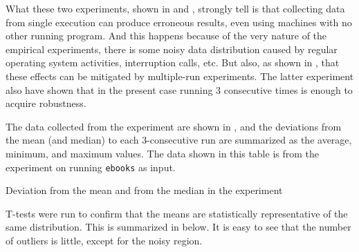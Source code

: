 What these two experiments, shown in  and , strongly tell is that collecting data from single execution can produce erroneous results, even using machines with no other running program. And this happens because of the very nature of the empirical experiments, there is some noisy data distribution caused by regular operating system activities, interruption calls, etc. But also, as shown in , that these effects can be mitigated by multiple-run experiments. The latter experiment also have shown that in the present case running $3$ consecutive times is enough to acquire robustness.

The data collected from the experiment are shown in , and the deviations from the mean (and median) to each $3$-consecutive run are summarized as the average, minimum, and maximum values. The data shown in this table is from the experiment on \bzip running {\tt ebooks} as input.

\begin{table}
  \centering
  \begin{tiny}
  
  \end{tiny}
  \caption{Deviation from the mean and from the median in the experiment}
  \label{tab:simStats}
\end{table}

T-tests were run to confirm that the means are statistically representative of the same distribution. This is summarized in  below. It is easy to see that the number of outliers is little, except for the noisy region.

